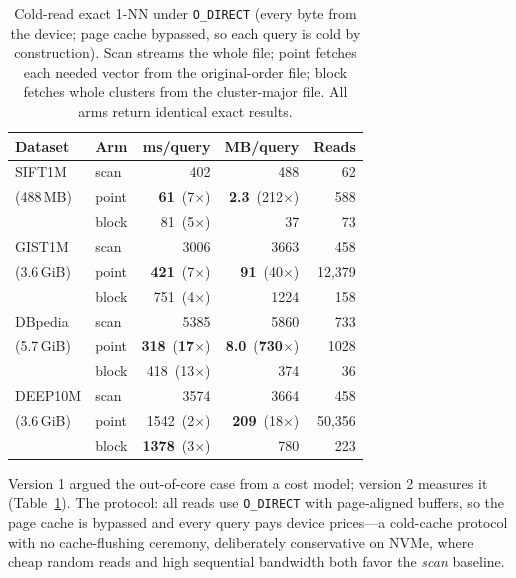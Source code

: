 \documentclass[sigconf,nonacm]{acmart}
\begin{document}
\begin{table}[t]
\caption{Cold-read exact 1-NN under \texttt{O\_DIRECT} (every byte from
the device; page cache bypassed, so each query is cold by construction).
Scan streams the whole file; point fetches each needed vector from the
original-order file; block fetches whole clusters from the cluster-major
file. All arms return identical exact results.}
\label{tab:ooc}
\small
\begin{tabular}{@{}llrrr@{}}
\toprule
Dataset & Arm & ms/query & MB/query & Reads \\
\midrule
SIFT1M       & scan  & 402  & 488  & 62 \\
(488\,MB)    & point & \textbf{61} \,(7$\times$) & \textbf{2.3} \,(212$\times$) & 588 \\
             & block & 81 \,(5$\times$) & 37 & 73 \\
\midrule
GIST1M       & scan  & 3006 & 3663 & 458 \\
(3.6\,GiB)   & point & \textbf{421} \,(7$\times$) & \textbf{91} \,(40$\times$) & 12{,}379 \\
             & block & 751 \,(4$\times$) & 1224 & 158 \\
\midrule
DBpedia      & scan  & 5385 & 5860 & 733 \\
(5.7\,GiB)   & point & \textbf{318} \,(\textbf{17$\times$}) & \textbf{8.0} \,(\textbf{730$\times$}) & 1028 \\
             & block & 418 \,(13$\times$) & 374 & 36 \\
\midrule
DEEP10M      & scan  & 3574 & 3664 & 458 \\
(3.6\,GiB)   & point & 1542 \,(2$\times$) & \textbf{209} \,(18$\times$) & 50{,}356 \\
             & block & \textbf{1378} \,(3$\times$) & 780 & 223 \\
\bottomrule
\end{tabular}
\end{table}

Version 1 argued the out-of-core case from a cost model; version 2 measures
it (Table~\ref{tab:ooc}). The protocol: all reads use \texttt{O\_DIRECT}
with page-aligned buffers, so the page cache is bypassed and every query
pays device prices---a cold-cache protocol with no cache-flushing
ceremony, deliberately conservative on NVMe, where cheap random reads and
high sequential bandwidth both favor the \emph{scan} baseline.
\end{document}
